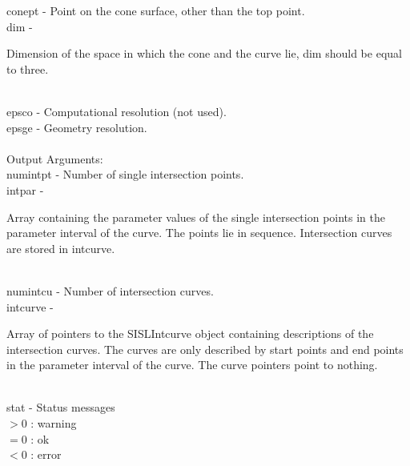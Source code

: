         \>\>    {\fov conept}   \> - \> Point on the cone surface, other than the top point.\\
        \>\>    {\fov dim}      \> - \> \begin{minipg2}
                                Dimension of the space in which the
                                cone and the curve
                                lie, dim should be equal to three.
                                \end{minipg2}\\[0.3ex]
        \>\>    {\fov epsco}    \> - \> Computational resolution (not used).\\
        \>\>    {\fov epsge}    \> - \> Geometry resolution.\\
\\
        \>Output Arguments:\\
        \>\>    {\fov numintpt}\> - \>  Number of single intersection points.\\
        \>\>    {\fov intpar}   \> - \> \begin{minipg2}
                        Array containing the parameter values of the
                        single intersection points in the parameter
                        interval of the curve. The points lie in sequence.
                        Intersection curves are stored in intcurve.
                                \end{minipg2}\\[0.8ex]
        \>\>    {\fov numintcu}\> - \>Number of intersection curves.\\
        \>\>    {\fov intcurve}\> - \>  \begin{minipg2}
                        Array of pointers to the SISLIntcurve object
                        containing descriptions of the intersection
                        curves. The curves are only described by start
                        points and end points in the parameter interval
                        of the curve. The curve pointers point
                        to nothing.
                                \end{minipg2}\\[0.8ex]
\newpagetabs
        \>\>    {\fov stat}     \> - \> Status messages\\
                \>\>\>\>\>              $> 0$   : warning\\
                \>\>\>\>\>              $= 0$   : ok\\
                \>\>\>\>\>              $< 0$   : error\\
